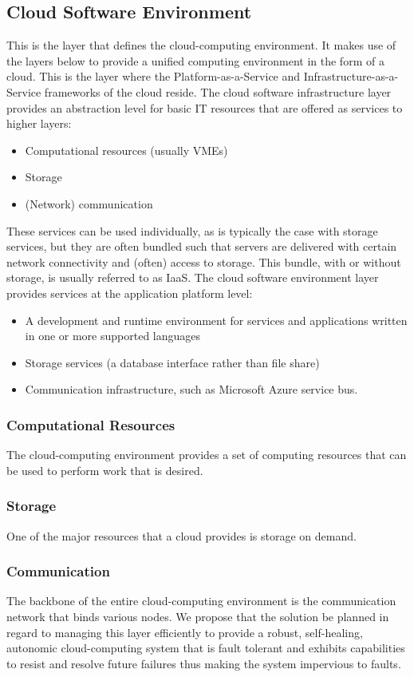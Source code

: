 \subsection{Cloud Software Environment}
This is the layer that defines the cloud-computing environment. It makes use of the layers below to provide a unified computing environment in the form of a cloud. This is the layer where the Platform-as-a-Service and Infrastructure-as-a-Service frameworks of the cloud reside.
The cloud software infrastructure layer provides an abstraction level for basic IT resources that are offered as services to higher layers:
	\begin{itemize}
		\item Computational resources (usually VMEs)
		\item Storage
		\item (Network) communication
	\end{itemize}
These services can be used individually, as is typically the case with storage services, but they are often bundled such that servers are delivered with certain network connectivity and (often) access to storage. This bundle, with or without storage, is usually referred to as IaaS.
The cloud software environment layer provides services at the application platform level: 
	\begin{itemize}
		\item A development and runtime environment for services and applications written in one or more supported languages
		\item Storage services (a database interface rather than file share)
		\item Communication infrastructure, such as Microsoft Azure service bus.
	\end{itemize}
\subsubsection{Computational Resources}
The cloud-computing environment provides a set of computing resources that can be used to perform work that is desired.
\subsubsection{Storage}
One of the major resources that a cloud provides is storage on demand.
\subsubsection{Communication}
The backbone of the entire cloud-computing environment is the communication network that binds various nodes.
We propose that the solution be planned in regard to managing this layer efficiently to provide a robust, self-healing, autonomic cloud-computing system that is fault tolerant and exhibits capabilities to resist and resolve future failures thus making the system impervious to faults.

